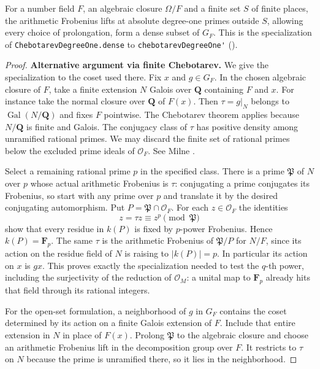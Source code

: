\begin{proposition}\label{prop:P-k-cheb}
For a number field $F$, an algebraic closure $\Omega/F$ and a finite
set $S$ of finite places, the arithmetic Frobenius lifts at absolute
degree-one primes outside $S$, allowing every choice of prolongation,
form a dense subset of $G_F$. This is the specialization of
\nolinkurl{ChebotarevDegreeOne.dense} to \nolinkurl{chebotarevDegreeOne'}
().
\end{proposition}
\begin{proof}
\par\noindent\textbf{Alternative argument via finite Chebotarev.} 
We give the specialization to the coset used there. Fix $x$ and
$g\in G_F$. In the chosen algebraic closure of $F$, take a finite
extension $N$ Galois over $\mathbf Q$ containing $F$ and $x$.
For instance take the normal closure over $\mathbf Q$ of $F(x)$.
Then $\tau=g|_N$ belongs to $\operatorname{Gal}(N/\mathbf Q)$ and fixes
$F$ pointwise. The Chebotarev theorem applies because $N/\mathbf Q$
is finite and Galois. The conjugacy class of $\tau$ has positive density
among unramified rational primes. We may discard the finite set of
rational primes below the excluded prime ideals of $\mathcal O_F$.
See Milne \cite[Theorem~8.31]{P-Milne-Cheb}.

Select a remaining rational prime $p$ in the specified class. There
is a prime $\mathfrak P$ of $N$ over $p$ whose actual arithmetic
Frobenius is $\tau$: conjugating a prime conjugates its Frobenius,
so start with any prime over $p$ and translate it by the desired
conjugating automorphism. Put $P=\mathfrak P\cap\mathcal O_F$. For
each $z\in\mathcal O_F$ the identities
\[
   z=\tau z\equiv z^p\pmod{\mathfrak P}
\]
show that every residue in $k(P)$ is fixed by $p$-power Frobenius.
Hence $k(P)=\mathbf F_p$. The same $\tau$ is the arithmetic Frobenius
of $\mathfrak P/P$ for $N/F$, since its action on the residue field
of $N$ is raising to $|k(P)|=p$. In particular its action on $x$ is
$gx$. This proves exactly the specialization needed to test the
$q$-th power, including the surjectivity of the reduction of
$\mathcal O_M$: a unital map to $\mathbf F_p$ already hits that
field through its rational integers.

For the open-set formulation, a neighborhood of $g$ in $G_F$
contains the coset determined by its action on a finite Galois
extension of $F$. Include that entire extension in $N$ in place of
$F(x)$. Prolong $\mathfrak P$ to the algebraic closure and choose an
arithmetic Frobenius lift in the decomposition group over $F$.
It restricts to $\tau$ on $N$ because the prime is unramified there,
so it lies in the neighborhood.


\end{proof}
